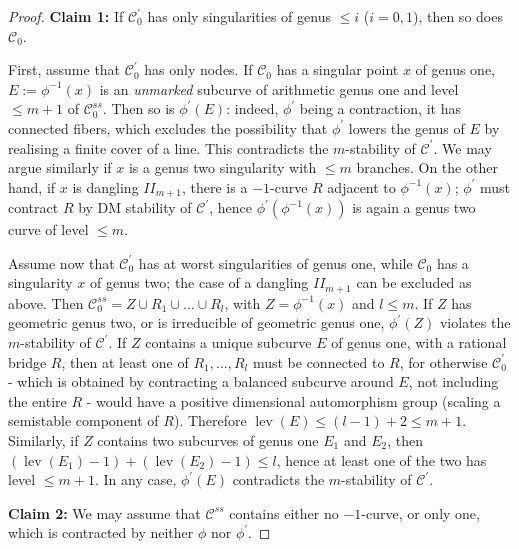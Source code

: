 \documentclass[11pt]{amsart}
\newcommand{\lev}{\operatorname{lev}}
\theoremstyle{plain}
\theoremstyle{definition}
\begin{document}
\begin{proof}
 \textbf{Claim 1:} If $\mathcal C^\prime_0$ has only singularities of genus $\leq i$ ($i=0,1$), then so does $\mathcal C_0$.
 
 \noindent First, assume that $\mathcal C^\prime_0$ has only nodes. If $\mathcal C_0$ has a singular point $x$ of genus one, $E:=\phi^{-1}(x)$ is an \emph{unmarked} subcurve of arithmetic genus one and level $\leq m+1$ of $\mathcal C^{ss}_0$. Then so is $\phi^\prime(E)$: indeed, $\phi^\prime$ being a contraction, it has connected fibers, which excludes the possibility that $\phi^\prime$ lowers the genus of $E$ by realising a finite cover of a line. This contradicts the $m$-stability of $\mathcal C^\prime$. We may argue similarly if $x$ is a genus two singularity with $\leq m$ branches. On the other hand, if $x$ is dangling $I\!I_{m+1}$, there is a $-1$-curve $R$ adjacent to $\phi^{-1}(x)$; $\phi^\prime$ must contract $R$ by DM stability of $\mathcal C^\prime$, hence $\phi^\prime(\phi^{-1}(x))$ is again a genus two curve of level $\leq m$.
 
 Assume now that $\mathcal C^\prime_0$ has at worst singularities of genus one, while $\mathcal C_0$ has a singularity $x$ of genus two; the case of a dangling $I\!I_{m+1}$ can be excluded as above. Then $\mathcal C^{ss}_0=Z\cup R_1\cup \ldots\cup R_l$, with $Z=\phi^{-1}(x)$ and $l\leq m$. If $Z$ has geometric genus two, or is irreducible of geometric genus one, $\phi^\prime(Z)$ violates the $m$-stability of $\mathcal C^\prime$. If $Z$ contains a unique subcurve $E$ of genus one, with a rational bridge $R$, then at least one of $R_1,\ldots,R_l$ must be connected to $R$, for otherwise $\mathcal C^\prime_0$ - which is obtained by contracting a balanced subcurve around $E$, not including the entire $R$ - would have a positive dimensional automorphism group (scaling a semistable component of $R$). Therefore $\lev(E)\leq (l-1)+2\leq m+1$. Similarly, if $Z$ contains two subcurves of genus one $E_1$ and $E_2$, then $(\lev(E_1)-1)+(\lev(E_2)-1)\leq l$, hence at least one of the two has level $\leq m+1$. In any case, $\phi^\prime(E)$ contradicts the $m$-stability of $\mathcal C^\prime$.
 
 \textbf{Claim 2:} We may assume that $\mathcal C^{ss}$ contains either no $-1$-curve, or only one, which is contracted by neither $\phi$ nor $\phi^\prime$.
 

\end{proof}
\end{document}

